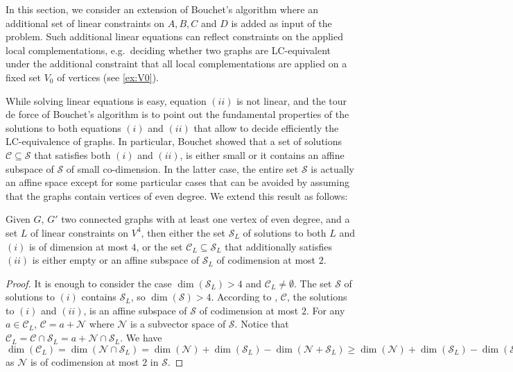 \documentclass[a4paper,UKenglish,cleveref,autoref,thm-restate]{arxiv}
\begin{document}
In this section, we consider an extension of Bouchet's algorithm where an additional set of linear constraints on $A,B,C$ and $D$ is added as input of the problem. Such additional linear equations can reflect constraints on the applied  local complementations, e.g.~deciding whether two graphs are LC-equivalent under the additional constraint that all local complementations are applied on a fixed set $V_0$ of vertices (see \cref{ex:V0}).



While solving linear equations is easy, equation $(ii)$ is not linear, and the tour de force of Bouchet's algorithm is to point out the fundamental properties of the solutions to both equations $(i)$ and $(ii)$ that allow to decide efficiently the LC-equivalence of graphs.  In particular, Bouchet showed that a set of solutions $\mathcal C\subseteq \mathcal S$ that satisfies both $(i)$ and $(ii)$,  is either small or it contains an affine subspace of $\mathcal S$ of small co-dimension. In  the latter case, the entire set $\mathcal S$ is  actually an affine space except for  some particular cases that can be avoided by assuming that the graphs contain vertices of even degree. We extend this result as follows:

\begin{lemma}\label{lemma:codim2}
Given $G$, $G'$ two connected graphs with at least one vertex of even degree, and a set $L$  of linear constraints on $V^4$,
 then either the set $\mathcal S_L$ of solutions to both $ L$ and $(i)$ is of dimension at most $4$, 
 or the set  $\mathcal C_L\subseteq \mathcal S_L$ that additionally satisfies  $(ii)$ is either empty or an affine subspace of $\mathcal S_L$ of codimension at most $2$.   
\end{lemma}

\begin{proof} It is enough to consider the case $\dim(\mathcal S_L)>4$ and $\mathcal C_L\neq \emptyset$. The set  $\mathcal S$ of solutions to $(i)$ contains $\mathcal S_L$, so $\dim(\mathcal S)>4$. According to \cite{Bouchet1991}, $\mathcal C$, the solutions to $(i)$ and $(ii)$, is an affine subspace of $\mathcal S$ of codimension at most $2$. For any  $a\in \mathcal C_L$, $\mathcal C = a+ \mathcal N$ where $ \mathcal N$ is a subvector space of $\mathcal S$. Notice that $\mathcal C_L = \mathcal C\cap \mathcal S_L = a+ \mathcal N\cap \mathcal S_L $. We have $\dim(\mathcal C_L)=\dim(\mathcal N\cap \mathcal S_L ) = \dim(\mathcal N)+\dim(\mathcal S_L )-\dim(\mathcal N + \mathcal S_L )\ge \dim(\mathcal N)+\dim(\mathcal S_L )-\dim(\mathcal S)\ge \dim(\mathcal S_L)-2$ as $\mathcal N$ is of codimension at most $2$ in $\mathcal S$. 
\end{proof}
\end{document}

